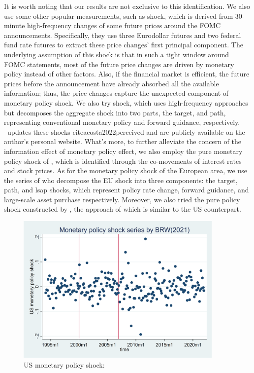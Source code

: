 It is worth noting that our results are not exclusive to this identification. We also use some other popular measurements, such as \cite{nakamura2018high} shock, which is derived from 30-minute high-frequency changes of some future prices around the FOMC announcements. Specifically, they use three Eurodollar futures and two federal fund rate futures to extract these price changes' first principal component. The underlying assumption of this shock is that in such a tight window around FOMC statements, most of the future price changes are driven by monetary policy instead of other factors. Also, if the financial market is efficient, the future prices before the announcement have already absorbed all the available information; thus, the price changes capture the unexpected component of monetary policy shock. We also try \cite{guraynak2005actions} shock, which uses high-frequency approaches but decomposes the aggregate shock into two parts, the target, and path, representing conventional monetary policy and forward guidance, respectively. \ updates these shocks cite{acosta2022perceived} and are publicly available on the author's personal website. What's more, to further alleviate the concern of the information effect of monetary policy effect, we also employ the pure monetary policy shock of \cite{jarocinski2020deconstructing}, which is identified through the co-movements of interest rates and stock prices. As for the monetary policy shock of the European area, we use the series of \cite{miranda2022tale} who decompose the EU shock into three components: the target, path, and lsap shocks, which represent policy rate change, forward guidance, and large-scale asset purchase respectively. Moreover, we also tried the pure policy shock constructed by \cite{jarocinski2020deconstructing}, the approach of which is similar to the US counterpart.


\begin{figure}[H]
    \centering
    \includegraphics[width=0.9\textwidth]{latex/drafts/pic/BRW.png}
    \caption{\small US monetary policy shock: \cite{bu2021unified}}
    \label{fig: BRW}
\end{figure}


